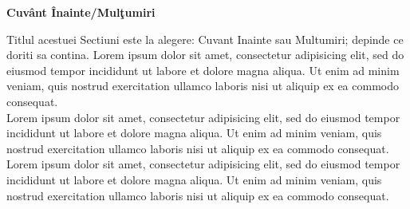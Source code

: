 \thispagestyle{plain} 


\vspace*{36pt}

\begin{center}

{\LARGE \textbf{Cuv\^ant \^Inainte/Mul\c{t}umiri}}

\end{center}

\vspace{36pt}
Titlul acestuei Sectiuni este la alegere: Cuvant Inainte sau Multumiri; depinde ce doriti sa contina. Lorem ipsum dolor sit amet, consectetur adipisicing elit, sed do eiusmod tempor incididunt ut labore et dolore magna aliqua. Ut enim ad minim veniam, quis nostrud exercitation ullamco laboris nisi ut aliquip ex ea commodo consequat.\\

Lorem ipsum dolor sit amet, consectetur adipisicing elit, sed do eiusmod tempor incididunt ut labore et dolore magna aliqua. Ut enim ad minim veniam, quis nostrud exercitation ullamco laboris nisi ut aliquip ex ea commodo consequat.\\

Lorem ipsum dolor sit amet, consectetur adipisicing elit, sed do eiusmod tempor incididunt ut labore et dolore magna aliqua. Ut enim ad minim veniam, quis nostrud exercitation ullamco laboris nisi ut aliquip ex ea commodo consequat.\\

\vspace{40pt}



\vspace*{\fill}